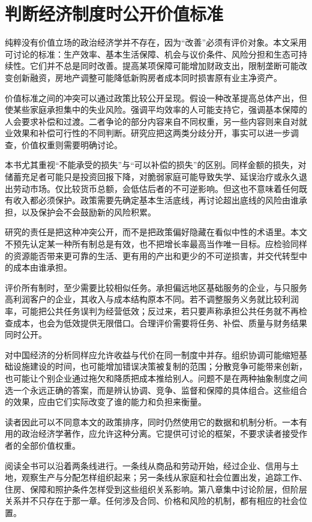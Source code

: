 \documentclass[UTF8,fontset=fandol,zihao=-4,oneside,openany]{ctexbook}
\begin{document}
\section{判断经济制度时公开价值标准}
纯粹没有价值立场的政治经济学并不存在，因为“改善”必须有评价对象。本文采用可讨论的标准：生产效率、基本生活保障、机会与议价条件、风险分担和生态可持续性。它们并不总是同时改善。提高某项保障可能增加财政支出，限制垄断可能改变创新融资，房地产调整可能降低新购房者成本同时损害原有业主净资产。

\label{arg:P015}
价值标准之间的冲突可以通过政策比较公开呈现。假设一种改革提高总体产出，但使某些家庭承担集中的失业风险。强调平均效率的人可能支持它，强调基本保障的人会要求补偿和过渡。二者争论的部分内容来自不同权重，另一些内容则来自对就业效果和补偿可行性的不同判断。研究应把这两类分歧分开，事实可以进一步调查，价值权重则需要明确讨论。

本书尤其重视“不能承受的损失”与“可以补偿的损失”的区别。同样金额的损失，对储蓄充足者可能只是投资回报下降，对脆弱家庭可能导致失学、延误治疗或永久退出劳动市场。仅比较货币总额，会低估后者的不可逆影响。但这也不意味着任何既有收入都必须保护。政策需要先确定基本生活底线，再讨论超出底线的风险由谁承担，以及保护会不会鼓励新的风险积累。

研究的责任是把这种冲突公开，而不是把政策偏好隐藏在看似中性的术语里。本文不预先认定某一种所有制总是有效，也不把增长率最高当作唯一目标。应检验同样的资源能否带来更可靠的生活、更有用的产出和更少的不可逆损害，并交代转型中的成本由谁承担。

\label{arg:P016}
评价所有制时，至少需要比较相似任务。承担偏远地区基础服务的企业，与只服务高利润客户的企业，其收入与成本结构原本不同。若不调整服务义务就比较利润率，可能把公共任务误判为经营低效；反过来，若只要声称承担公共任务就不再检查成本，也会为低效提供无限借口。合理评价需要将任务、补偿、质量与财务结果同时公开。

对中国经济的分析同样应允许收益与代价在同一制度中并存。组织协调可能缩短基础设施建设的时间，也可能增加错误决策被复制的范围；分散竞争可能带来创新，也可能让个别企业通过拖欠和降质把成本推给别人。问题不是在两种抽象制度之间选一个永远正确的答案，而是辨认协调、竞争、监督和保障的具体组合。这些组合的效果，应由它们实际改变了谁的能力和负担来衡量。

读者因此可以不同意本文的政策排序，同时仍然使用它的数据和机制分析。一本有用的政治经济学著作，应允许这种分离。它提供可讨论的框架，不要求读者接受作者的全部价值权重。

\label{arg:P017}
阅读全书可以沿着两条线进行。一条线从商品和劳动开始，经过企业、信用与土地，观察生产与分配怎样组织起来；另一条线从家庭和社会位置出发，追踪工作、住房、保障和照护条件怎样受到这些组织关系影响。第八章集中讨论阶层，但阶层关系并不只存在于那一章。任何涉及合同、价格和风险的机制，都有相应的社会位置。
\end{document}
